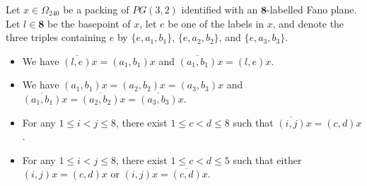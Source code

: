 \documentclass[10pt,a4paper]{amsart}
\newcommand{\eight}{{\mathbf 8}}
\newcommand{\qpx}{\Omega_{240}}
\begin{document}
\begin{prop}\label{prop:signact}
Let $x \in \qpx$ be a packing of $PG(3, 2)$ identified with an $\eight$-labelled Fano plane. Let $l \in \eight$ 
be the basepoint of $x$, let $e$ be one of the labels in $x$, and denote the three triples containing
$e$ by $\{e, a_1, b_1\}$, $\{e, a_2, b_2\}$, and $\{e, a_3, b_3\}$. 
\begin{itemize}
\item[{\rm (i)}]{We have $\overline{(l, e)}x = (a_1, b_1)x$ and $\overline{(a_1, b_1)}x = (l, e)x$.}
\item[{\rm (ii)}]{We have $(a_1, b_1)x = (a_2, b_2)x = (a_3, b_3)x$ and
$\overline{(a_1, b_1)}x = \overline{(a_2, b_2)}x = \overline{(a_3, b_3)}x$.}
\item[{\rm (iii)}]{For any $1 \leq i < j \leq 8$, there exist $1 \leq c < d \leq 8$ such that
$\overline{(i, j)}x = (c, d)x$.}
\item[{\rm (iv)}]{For any $1 \leq i < j \leq 8$, there exist $1 \leq c < d \leq 5$ such that either
$(i, j)x = (c, d)x$ or $(i, j)x = \overline{(c, d)}x$.}
\end{itemize}
\end{prop}
\end{document}

